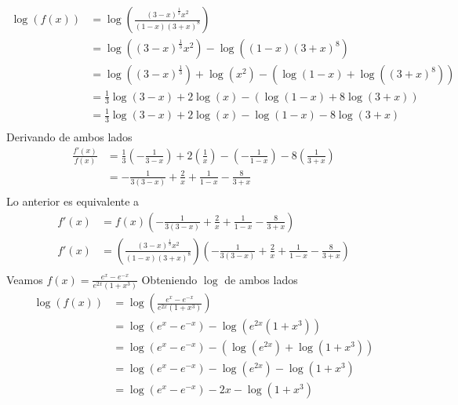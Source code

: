 \documentclass[a4paper]{article}
\begin{document}
\begin{align*}
    \log{\left(f(x)\right)} &= \log{\left(\frac{(3 - x)^{\frac{1}{3}}x^2}{(1 - x)(3 + x)^{8}}\right)} \\
                            &= \log{\left((3 - x)^{\frac{1}{3}}x^2\right)} - \log{\left((1 - x)(3 + x)^{8}\right)} \\
                            &= \log{\left((3 - x)^{\frac{1}{3}}\right)} + \log{\left(x^2\right)} - \left(\log{(1 - x)} + \log{\left((3 + x)^{8}\right)}\right) \\
                            &= \frac{1}{3}\log{\left(3 - x\right)} + 2\log{\left(x\right)} - \left(\log{(1 - x)} + 8\log{\left(3 + x\right)}\right) \\
                            &= \frac{1}{3}\log{\left(3 - x\right)} + 2\log{\left(x\right)} - \log{(1 - x)} - 8\log{\left(3 + x\right)} \\
\end{align*}
Derivando de ambos lados
\begin{align*}
    \frac{f'(x)}{f(x)} &= \frac{1}{3}\left(-\frac{1}{3 - x}\right) + 2\left(\frac{1}{x}\right) - \left(- \frac{1}{1 - x}\right) - 8\left(\frac{1}{3 + x}\right) \\
                       &= -\frac{1}{3(3 - x)} + \frac{2}{x} + \frac{1}{1 - x} - \frac{8}{3 + x} \\
\end{align*}
Lo anterior es equivalente a
\begin{align*}
    f'(x) &= f(x) \left(-\frac{1}{3(3 - x)} + \frac{2}{x} + \frac{1}{1 - x} - \frac{8}{3 + x}\right) \\
    f'(x) &= \left(\frac{(3 - x)^{\frac{1}{3}}x^2}{(1 - x)(3 + x)^{8}}\right) \left(-\frac{1}{3(3 - x)} + \frac{2}{x} + \frac{1}{1 - x} - \frac{8}{3 + x}\right) \\
\end{align*}
Veamos \(f(x) = \frac{e^{x} - e^{-x}}{e^{2x}(1 + x^3)}\)
\newline
Obteniendo \(\log\) de ambos lados
\begin{align*}
    \log{\left(f(x)\right)} &= \log{\left(\frac{e^{x} - e^{-x}}{e^{2x}(1 + x^3)}\right)} \\
                            &= \log{\left(e^{x} - e^{-x}\right)} - \log{\left(e^{2x}(1 + x^3)\right)} \\
                            &= \log{\left(e^{x} - e^{-x}\right)} - \left(\log{\left(e^{2x}\right)} + \log{\left(1 + x^3\right)}\right) \\
                            &= \log{\left(e^{x} - e^{-x}\right)} - \log{\left(e^{2x}\right)} - \log{\left(1 + x^3\right)} \\
                            &= \log{\left(e^{x} - e^{-x}\right)} - 2x - \log{\left(1 + x^3\right)} \\
\end{align*}
\end{document}
